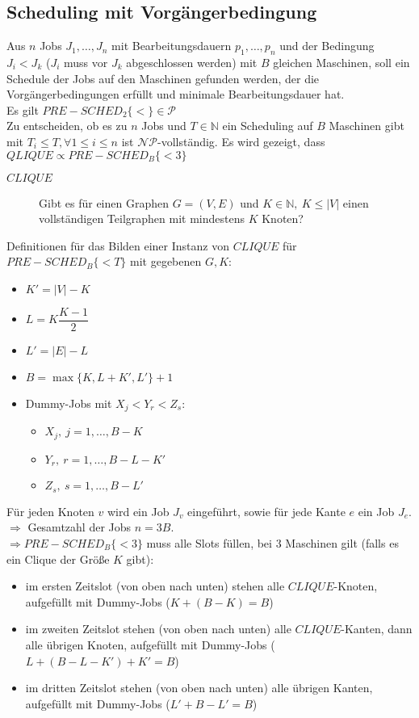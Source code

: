 \subsection{Scheduling mit Vorgängerbedingung}
Aus $n$ Jobs $J_1,\dots,J_n$ mit Bearbeitungsdauern $p_1,\dots,p_n$ und der Bedingung $J_i<J_k$ ($J_i$ muss vor $J_k$ abgeschlossen werden) mit $B$ gleichen Maschinen, soll ein Schedule der Jobs auf den Maschinen gefunden werden, der die Vorgängerbedingungen erfüllt und minimale Bearbeitungsdauer hat.\\
Es gilt $PRE-SCHED_2\{<\}\in \mathcal{P}$\\
Zu entscheiden, ob es zu $n$ Jobs und $T\in\mathbb{N}$ ein Scheduling auf $B$ Maschinen gibt mit $T_i\leq T, \forall 1\leq i\leq n$ ist $\mathcal{NP}$-vollständig.
\vspace*{-1\baselineskip}
\Proof
\vspace*{-.5\baselineskip}
Es wird gezeigt, dass $QLIQUE \propto PRE-SCHED_B\{< 3\}$
\begin{description}
	\item[$CLIQUE$] Gibt es für einen Graphen $G=(V,E)$ und $K\in\mathbb{N},~K\leq |V|$ einen vollständigen Teilgraphen mit mindestens $K$ Knoten?
\end{description}
Definitionen für das Bilden einer Instanz von $CLIQUE$ für $PRE-SCHED_B\{< T\}$ mit gegebenen $G,K$:
	\begin{itemize}[itemsep=-1pt]
		\item $K'=|V|-K$
		\item $L=K\dfrac{K-1}{2}$
		\item $L'=|E|-L$
		\item $B=\max\{K,L+K',L'\}+1$
		\item Dummy-Jobs mit $X_j<Y_r<Z_s$:
			\begin{itemize}
				\item $X_j,~j=1,\dots,B-K$
				\item $Y_r,~r=1,\dots,B-L-K'$
				\item $Z_s,~s=1,\dots,B-L'$
			\end{itemize}
	\end{itemize}
Für jeden Knoten $v$ wird ein Job $J_v$ eingeführt, sowie für jede Kante $e$ ein Job $J_e$.\\
$\Rightarrow$ Gesamtzahl der Jobs $n=3B$.\\
$\Rightarrow PRE-SCHED_B\{< 3\}$ muss alle Slots füllen, bei $3$ Maschinen gilt (falls es ein Clique der Größe $K$ gibt):
	\begin{itemize}[itemsep=-1pt]
		\item im ersten Zeitslot (von oben nach unten) stehen alle $CLIQUE$-Knoten, aufgefüllt mit Dummy-Jobs ($K+(B-K)=B$)
		\item im zweiten Zeitslot stehen (von oben nach unten) alle $CLIQUE$-Kanten, dann alle übrigen Knoten, aufgefüllt mit Dummy-Jobs ($L+(B-L-K')+K'=B$)
		\item im dritten Zeitslot stehen (von oben nach unten) alle übrigen Kanten, aufgefüllt mit Dummy-Jobs ($L'+B-L'=B$)
	\end{itemize}
